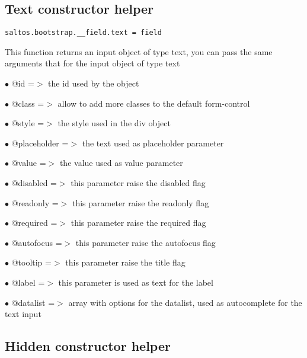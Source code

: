 \documentclass[a4paper]{book}
\begin{document}
\hypertarget{toc435}{}
\subsection{Text constructor helper}

\begin{lstlisting}
saltos.bootstrap.__field.text = field
\end{lstlisting}

This function returns an input object of type text, you can pass the same arguments
that for the input object of type text

\begin{compactitem}
\item[\color{myblue}$\bullet$] @id          =$>$ the id used by the object
\item[\color{myblue}$\bullet$] @class       =$>$ allow to add more classes to the default form-control
\item[\color{myblue}$\bullet$] @style       =$>$ the style used in the div object
\item[\color{myblue}$\bullet$] @placeholder =$>$ the text used as placeholder parameter
\item[\color{myblue}$\bullet$] @value       =$>$ the value used as value parameter
\item[\color{myblue}$\bullet$] @disabled    =$>$ this parameter raise the disabled flag
\item[\color{myblue}$\bullet$] @readonly    =$>$ this parameter raise the readonly flag
\item[\color{myblue}$\bullet$] @required    =$>$ this parameter raise the required flag
\item[\color{myblue}$\bullet$] @autofocus   =$>$ this parameter raise the autofocus flag
\item[\color{myblue}$\bullet$] @tooltip     =$>$ this parameter raise the title flag
\item[\color{myblue}$\bullet$] @label       =$>$ this parameter is used as text for the label
\item[\color{myblue}$\bullet$] @datalist    =$>$ array with options for the datalist, used as autocomplete for the text input
\end{compactitem}

\hypertarget{toc436}{}
\subsection{Hidden constructor helper}
\end{document}
